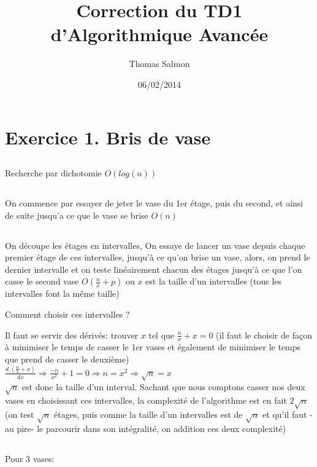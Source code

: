 \documentclass[a4paper]{article}
\title{Correction du TD1 d'Algorithmique Avancée}
\author{Thomas Salmon}
\date{06/02/2014}
\begin{document}
\maketitle
\section{Exercice 1. Bris de vase}
\subsection{}
Recherche par dichotomie $O(log(n))$
\subsection{}
On commence par essayer de jeter le vase du 1er étage, puis du second, et ainsi de suite jusqu'a ce que le vase se brise $O(n)$
\subsection{}
On découpe les étages en intervalles, On essaye de lancer un vase depuis chaque premier étage de ces intervalles, jusqu'à ce qu'on brise un vase, alors, on prend le dernier intervalle et on teste linéairement chacun des étages jusqu'à ce que l'on casse le second vase $O(\frac{n}{x}+p)$ ou $x$ est la taille d'un intervalles (tous les intervalles font la même taille)  

Comment choisir ces intervalles ? 

Il faut se servir des dérivés: trouver $x$ tel que $\frac{n}{x}+x = 0$ (il faut le choisir de façon à minimiser le temps de casser le 1er vases et également de minimiser le temps que prend de casser le deuxième) \\

\begin{math}
  \frac{d.(\frac{n}{x}+x)}{dx} \Rightarrow \frac{-n}{x^2} + 1 = 0 \Rightarrow n = x^2 \Rightarrow \sqrt{n} = x
\end{math}\\

$\sqrt{n}$ est donc la taille d'un interval. Sachant que nous comptons casser nos deux vases en choisissant ces intervalles, la complexité de l'algorithme est en fait $2\sqrt{n}$ (on test $\sqrt{n}$ étages, puis comme la taille d'un intervalles est de $\sqrt{n}$ et qu'il faut -au pire- le parcourir dans son intégralité, on addition ces deux complexité)
\subsection{}
Pour 3 vases:  
\end{document}

